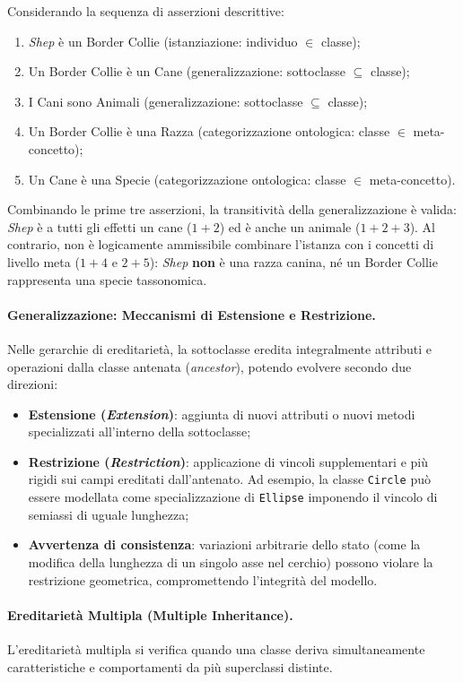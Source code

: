 \documentclass[12pt]{extarticle}
\begin{document}
\noindent Considerando la sequenza di asserzioni descrittive:
\begin{enumerate}
    \item \textit{Shep} è un Border Collie (istanziazione: individuo $\in$ classe);
    \item Un Border Collie è un Cane (generalizzazione: sottoclasse $\subseteq$ classe);
    \item I Cani sono Animali (generalizzazione: sottoclasse $\subseteq$ classe);
    \item Un Border Collie è una Razza (categorizzazione ontologica: classe $\in$ meta-concetto);
    \item Un Cane è una Specie (categorizzazione ontologica: classe $\in$ meta-concetto).
\end{enumerate}
Combinando le prime tre asserzioni, la transitività della generalizzazione è valida: \textit{Shep} è a tutti gli effetti un cane ($1+2$) ed è anche un animale ($1+2+3$).
Al contrario, non è logicamente ammissibile combinare l'istanza con i concetti di livello meta ($1+4$ e $2+5$): \textit{Shep} \textbf{non} è una razza canina, né un Border Collie rappresenta una specie tassonomica.

\paragraph{Generalizzazione: Meccanismi di Estensione e Restrizione.}
Nelle gerarchie di ereditarietà, la sottoclasse eredita integralmente attributi e operazioni dalla classe antenata (\textit{ancestor}), potendo evolvere secondo due direzioni:
\begin{itemize}
    \item \textbf{Estensione (\textit{Extension})}: aggiunta di nuovi attributi o nuovi metodi specializzati all'interno della sottoclasse;
    \item \textbf{Restrizione (\textit{Restriction})}: applicazione di vincoli supplementari e più rigidi sui campi ereditati dall'antenato. Ad esempio, la classe \texttt{Circle} può essere modellata come specializzazione di \texttt{Ellipse} imponendo il vincolo di semiassi di uguale lunghezza;
    \item \textbf{Avvertenza di consistenza}: variazioni arbitrarie dello stato (come la modifica della lunghezza di un singolo asse nel cerchio) possono violare la restrizione geometrica, compromettendo l'integrità del modello.
\end{itemize}

\paragraph{Ereditarietà Multipla (Multiple Inheritance).}
L'ereditarietà multipla si verifica quando una classe deriva simultaneamente caratteristiche e comportamenti da più superclassi distinte.
\end{document}

